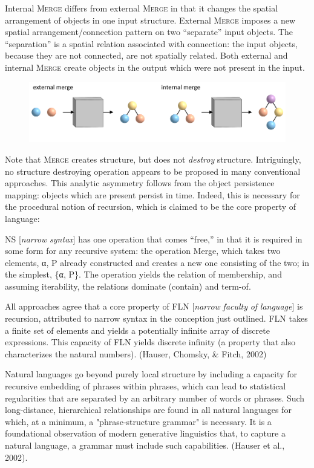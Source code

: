   Internal \textsc{Merge} differs from external \textsc{Merge} in that it changes the spatial arrangement of objects in one input structure. External \textsc{Merge} imposes a new spatial arrangement/connection pattern on two “separate” input objects. The “separation” is a spatial relation associated with connection: the input objects, because they are not connected, are not spatially related. Both external and internal \textsc{Merge} create objects in the output which were not present in the input. 

  
\begin{figure}
\includegraphics[width=\textwidth]{figures/Tilsen-img109.png}
\caption{\missingcaption}
\label{fig:}
\end{figure}
 

  Note that \textsc{Merge} creates structure, but does not \textit{destroy} structure. Intriguingly, no structure destroying operation appears to be proposed in many conventional approaches. This analytic asymmetry follows from the object persistence mapping: objects which are present persist in time. Indeed, this is necessary for the procedural notion of recursion, which is claimed to be the core property of language:

NS [\textit{narrow} \textit{syntax}] has one operation that comes “free,” in that it is required in some form for any recursive system: the operation Merge, which takes two elements, α, P already constructed and creates a new one consisting of the two; in the simplest, \{α, P\}. The operation yields the relation of membership, and assuming iterability, the relations dominate (contain) and term-of. \citep{Chomsky2001b}

All approaches agree that a core property of FLN [\textit{narrow} \textit{faculty} \textit{of} \textit{language}] is recursion, attributed to narrow syntax in the conception just outlined. FLN takes a finite set of elements and yields a potentially infinite array of discrete expressions. This capacity of FLN yields discrete infinity (a property that also characterizes the natural numbers). (Hauser, Chomsky, \& Fitch, 2002)

Natural languages go beyond purely local structure by including a capacity for recursive embedding of phrases within phrases, which can lead to statistical regularities that are separated by an arbitrary number of words or phrases. Such long-distance, hierarchical relationships are found in all natural languages for which, at a minimum, a "phrase-structure grammar" is necessary. It is a foundational observation of modern generative linguistics that, to capture a natural language, a grammar must include such capabilities. (Hauser et al., 2002). 

